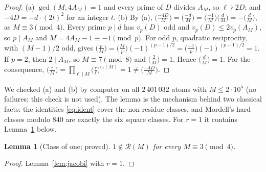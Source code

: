\documentclass[11pt,reqno]{amsart}
\newtheorem{lemma}[theorem]{Lemma}
\theoremstyle{definition}
\newcommand{\cR}{\mathcal R}
\begin{document}
\begin{proof}
(a) $\gcd(M,4A_M)=1$ and every prime of $D$ divides $A_M$, so $\ell\nmid2D$;
and $-4D=-d\cdot(2t)^2$ for an integer $t$.  (b) By (a),
$\big(\frac{-4D}M\big)=\big(\frac{-d}M\big)=\big(\frac{-1}M\big)\big(\frac dM\big)=-\big(\frac dM\big)$,
as $M\equiv3\pmod4$.  Every prime $p\mid d$ has $v_p(D)$ odd and
$v_p(D)\le2v_p(A_M)$, so $p\mid A_M$ and $M=4A_M-1\equiv-1\pmod p$.  For odd
$p$, quadratic reciprocity, with $(M-1)/2$ odd, gives
$\big(\frac pM\big)=\big(\frac Mp\big)(-1)^{(p-1)/2}=\big(\frac{-1}p\big)(-1)^{(p-1)/2}=1$.
If $p=2$, then $2\mid A_M$, so $M\equiv7\pmod8$ and $\big(\frac2M\big)=1$.  Hence
$\big(\frac dM\big)=1$.  For the consequence,
$\big(\frac rM\big)=\prod_{\ell\mid M}\big(\frac r\ell\big)^{v_\ell(M)}=1\ne\big(\frac{-4D}M\big)$.
\end{proof}

We checked (a) and (b) by computer on all $2\,401\,032$ atoms with
$M\le2\cdot10^5$ (no failures; this check is not used).  The lemma is the
mechanism behind two classical facts: the identities \eqref{eq:ident} cover
the non-residue classes, and Mordell's hard classes modulo $840$ are exactly
the six square classes.  For $r=1$ it contains Lemma~\ref{lem:one} below.

\begin{lemma}[Class of one; proved]\label{lem:one}
$1\notin\cR(M)$ for every $M\equiv3\pmod4$.
\end{lemma}

\begin{proof}
Lemma~\ref{lem:jacobi} with $r=1$.
\end{proof}
\end{document}
